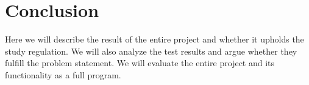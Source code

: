 \chapter{Conclusion}
\label{chap:conc}

Here we will describe the result of the entire project and whether it upholds the study regulation. We will also analyze the test results and argue whether they fulfill the problem statement. We will evaluate the entire project and its functionality as a full program.










